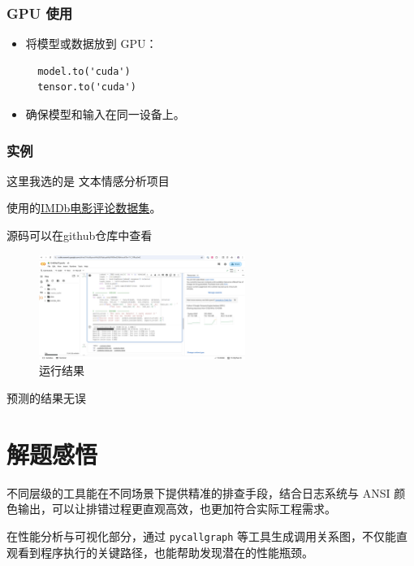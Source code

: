 \documentclass[a4paper,12pt]{ctexart}
\begin{document}
\subsubsection{GPU 使用}
\begin{itemize}
  \item 将模型或数据放到 GPU：
  \begin{verbatim}
  model.to('cuda')
  tensor.to('cuda')
  \end{verbatim}
  \item 确保模型和输入在同一设备上。
\end{itemize}


\subsubsection{实例}

这里我选的是 文本情感分析项目

使用的\href{https://ai.stanford.edu/~amaas/data/sentiment}{IMDb电影评论数据集}。


源码可以在github仓库中查看

\begin{figure}[htbp]
  \centering
  \includegraphics[width=0.6\textwidth]{pytorch.jpg}
  \caption{运行结果}
  \label{fig:pytorch}
\end{figure}

预测的结果无误


\newpage

\section{解题感悟}
不同层级的工具能在不同场景下提供精准的排查手段，结合日志系统与 ANSI 颜色输出，可以让排错过程更直观高效，也更加符合实际工程需求。

\vspace{14pt}

在性能分析与可视化部分，通过 \texttt{pycallgraph} 等工具生成调用关系图，不仅能直观看到程序执行的关键路径，也能帮助发现潜在的性能瓶颈。

\vspace{14pt}
\end{document}
